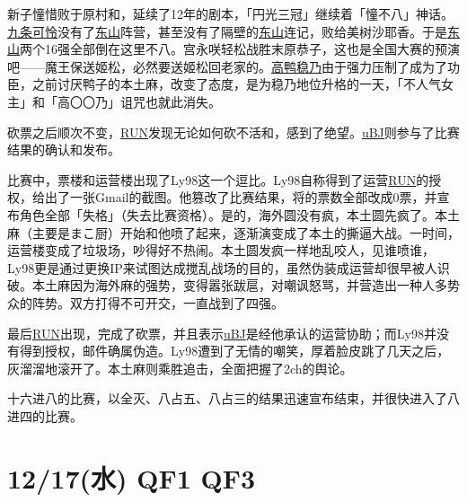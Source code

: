 新子憧惜败于原村和，延续了12年的剧本，「円光三冠」继续着「憧不八」神话。\uline{九条可怜}没有了\uline{东山}阵营，甚至没有了隔壁的\uline{东山}连记，败给美树沙耶香。于是\uline{东山}两个16强全部倒在这里不八。宫永咲轻松战胜末原恭子，这也是全国大赛的预演吧——魔王保送姬松，必然要送姬松回老家的。\uline{高鸭稳乃}由于强力压制了成为了功臣，之前讨厌鸭子的本土麻，改变了态度，是为稳乃地位升格的一天，「不人气女主」和「高〇〇乃」诅咒也就此消失。

砍票之后顺次不变，\uline{RUN}发现无论如何砍不活和，感到了绝望。\uline{uBJ}则参与了比赛结果的确认和发布。

比赛中，票楼和运营楼出现了Ly98这一个逗比。Ly98自称得到了运营\uline{RUN}的授权，给出了一张Gmail的截图。他篡改了比赛结果，将的票数全部改成0票，并宣布角色全部「失格」（失去比赛资格）。是的，海外圆没有疯，本土圆先疯了。本土麻（主要是まこ厨）开始和他喷了起来，逐渐演变成了本土的撕逼大战。一时间，运营楼变成了垃圾场，吵得好不热闹。本土圆发疯一样地乱咬人，见谁喷谁，Ly98更是通过更换IP来试图达成搅乱战场的目的，虽然伪装成运营却很早被人识破。本土麻因为海外麻的强势，变得嚣张跋扈，对嘲讽怒骂，并营造出一种人多势众的阵势。双方打得不可开交，一直战到了四强。

最后\uline{RUN}出现，完成了砍票，并且表示\uline{uBJ}是经他承认的运营协助；而Ly98并没有得到授权，邮件确属伪造。Ly98遭到了无情的嘲笑，厚着脸皮跳了几天之后，灰溜溜地滚开了。本土麻则乘胜追击，全面把握了2ch的舆论。

十六进八的比赛，以全灭、八占五、八占三的结果迅速宣布结束，并很快进入了八进四的比赛。

\section{12/17(水) QF1 QF3}


